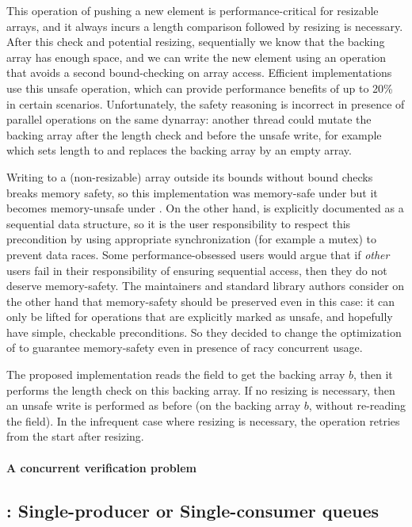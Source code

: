 This operation of pushing a new element is performance-critical for resizable arrays, and it always incurs a length comparison followed by resizing is necessary. After this check and potential resizing, sequentially we know that the backing array has enough space, and we can write the new element using an  operation that avoids a second bound-checking on array access. Efficient implementations use this unsafe operation, which can provide performance benefits of up to 20\% in certain scenarios. Unfortunately, the safety reasoning is incorrect in presence of parallel operations on the same dynarray: another thread could mutate the backing array after the length check and before the unsafe write, for example  which sets length to  and replaces the backing array by an empty array.

Writing to a (non-resizable) array outside its bounds without bound checks breaks memory safety, so this implementation was memory-safe under \OCamlFour but it becomes memory-unsafe under \OCamlFive. On the other hand,  is explicitly documented as a sequential data structure, so it is the user responsibility to respect this precondition by using appropriate synchronization (for example a mutex) to prevent data races. Some performance-obsessed users would argue that if \emph{other} users fail in their responsibility of ensuring sequential access, then they do not deserve memory-safety. The \OCaml maintainers and standard library authors consider on the other hand that memory-safety should be preserved even in this case: it can only be lifted for operations that are explicitly marked as unsafe, and hopefully have simple, checkable preconditions. So they decided to change the optimization of  to guarantee memory-safety even in presence of racy concurrent usage.

The proposed implementation reads the  field to get the backing array $b$, then it performs the length check on this backing array. If no resizing is necessary, then an unsafe write is performed as before (on the backing array $b$, without re-reading the  field). In the infrequent case where resizing is necessary, the operation retries from the start after resizing.

\paragraph{A concurrent verification problem}



\subsection{\Saturn: Single-producer or Single-consumer queues}



